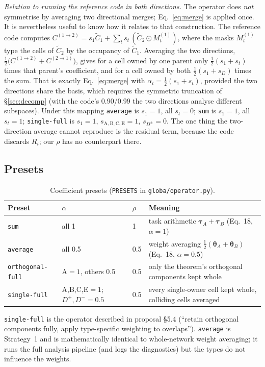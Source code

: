 \documentclass[11pt,a4paper]{article}
\newcommand{\tauv}{\boldsymbol{\tau}}
\newcommand{\thetav}{\boldsymbol{\theta}}
\newcommand{\Ct}{\tilde{C}}
\newcommand{\Dp}{D^{+}}
\newcommand{\Dm}{D^{-}}
\newcommand{\code}[1]{\texttt{#1}}
\begin{document}
\emph{Relation to running the reference code in both directions.} The operator does \emph{not} symmetrise by averaging two directional merges; Eq.~\ref{eq:merge} is applied once. It is nevertheless useful to know how it relates to that construction. The reference code computes $C^{(1\to2)}=s_1\Ct_1+\sum_t s_t\,(\Ct_2\odot M_t^{(1)})$, where the masks $M_t^{(1)}$ type the cells of $\Ct_2$ by the occupancy of $\Ct_1$. Averaging the two directions, $\tfrac12\bigl(C^{(1\to2)}+C^{(2\to1)}\bigr)$, gives for a cell owned by one parent only $\tfrac12(s_1+s_t)$ times that parent's coefficient, and for a cell owned by both $\tfrac12(s_1+s_D)$ times the sum. That is exactly Eq.~\ref{eq:merge} with $\alpha_t=\tfrac12(s_1+s_t)$, provided the two directions share the basis, which requires the symmetric truncation of \S\ref{sec:decomp} (with the code's 0.90/0.99 the two directions analyse different subspaces). Under this mapping \code{average} is $s_1=1$, all $s_t=0$; \code{sum} is $s_1=1$, all $s_t=1$; \code{single-full} is $s_1=1$, $s_{\mathrm{A,B,C,E}}=1$, $s_{D^\pm}=0$. The one thing the two-direction average cannot reproduce is the residual term, because the code discards $R_i$; our $\rho$ has no counterpart there.

\subsection{Presets}
\begin{table}[h]
\centering\small
\caption{Coefficient presets (\code{PRESETS} in \code{globa/operator.py}).}
\label{tab:presets}
\begin{tabular}{llll}
\toprule
Preset & $\alpha$ & $\rho$ & Meaning \\
\midrule
\code{sum} & all 1 & 1 & task arithmetic $\tauv_A+\tauv_B$ (Eq.~18, $\alpha=1$) \\
\code{average} & all 0.5 & 0.5 & weight averaging $\tfrac12(\thetav_A+\thetav_B)$ (Eq.~18, $\alpha=0.5$) \\
\code{orthogonal-full} & A$=1$, others 0.5 & 0.5 & only the theorem's orthogonal components kept whole \\
\code{single-full} & A,B,C,E$=1$; $\Dp,\Dm=0.5$ & 0.5 & every single-owner cell kept whole, colliding cells averaged \\
\bottomrule
\end{tabular}
\end{table}

\code{single-full} is the operator described in proposal \S5.4 (``retain orthogonal components fully, apply type-specific weighting to overlaps''). \code{average} is Strategy~1 and is mathematically identical to whole-network weight averaging; it runs the full analysis pipeline (and logs the diagnostics) but the types do not influence the weights.
\end{document}
